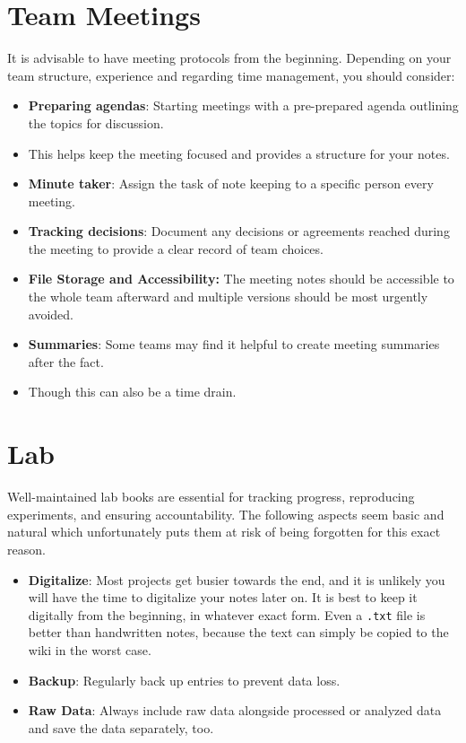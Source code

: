 \section{Team Meetings} \label{sec:team-meetings} 
It is advisable to have meeting protocols from the beginning.
Depending on your team structure, experience and regarding time management, you should consider:
\begin{itemize}
    \item \textbf{Preparing agendas}: Starting meetings with a pre-prepared agenda outlining the topics for discussion.
    \item This helps keep the meeting focused and provides a structure for your notes.
    \item \textbf{Minute taker}: Assign the task of note keeping to a specific person every meeting.
    \item \textbf{Tracking decisions}: Document any decisions or agreements reached during the meeting to provide a clear record of team choices.
    \item \textbf{File Storage and Accessibility:} The meeting notes should be accessible to the whole team afterward and multiple versions should be most urgently avoided.
    \item \textbf{Summaries}: Some teams may find it helpful to create meeting summaries after the fact.
    \item Though this can also be a time drain.
\end{itemize}
\section{Lab} \label{sec:lab} 
Well-maintained lab books are essential for tracking progress, reproducing experiments, and ensuring accountability.
The following aspects seem basic and natural which unfortunately puts them at risk of being forgotten for this exact reason.  
\begin{itemize}
    \item \textbf{Digitalize}: Most projects get busier towards the end, and it is unlikely you will have the time to digitalize your notes later on.
    It is best to keep it digitally from the beginning, in whatever exact form.
    Even a \texttt{.txt} file is better than handwritten notes, because the text can simply be copied to the wiki in
    the worst case.
    \item \textbf{Backup}: Regularly back up entries to prevent data loss.
    \item \textbf{Raw Data}: Always include raw data alongside processed or analyzed data and save the data separately, too.
\end{itemize}

